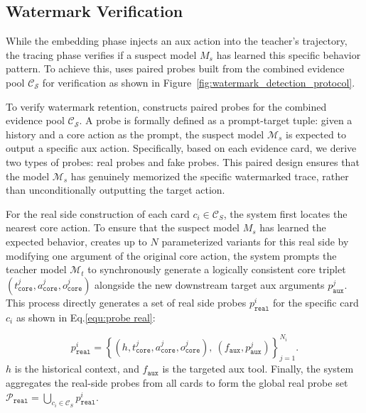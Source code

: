 \subsection{Watermark Verification}

\label{Detection}
While the embedding phase injects an aux action into the teacher's trajectory, the tracing phase verifies if a suspect model $M_s$ has learned this specific behavior pattern. To achieve this, \name{} uses paired probes built from the combined evidence pool $\mathcal{C}_{\mathcal{S}}$ for verification as shown in Figure~\ref{fig:watermark_detection_protocol}.



 To verify watermark retention, \name{} constructs paired probes for the combined evidence pool $\mathcal{C}_{\mathcal{S}}$. A probe is formally defined as a prompt-target tuple: given a history and a core action as the prompt, the suspect model $\mathcal{M}_s$ is expected to output a specific aux action. Specifically, based on each evidence card, we derive two types of probes: real probes and  fake probes. This paired design ensures that the model $\mathcal{M}_s$ has genuinely memorized the specific watermarked trace, rather than unconditionally outputting the target action.

For the real side construction of each card $c_i \in \mathcal{C}_S$, the system first locates the nearest core action. To ensure that the suspect model $M_s$ has learned the expected behavior, \name{} creates up to $N$ parameterized variants for this real side by modifying one argument of the original core action, the system prompts the teacher model $\mathcal{M}_t$ to synchronously generate a logically consistent core triplet $(t_{\mathtt{core}}^j, a_{\mathtt{core}}^j, o_{\mathtt{core}}^j)$ alongside the new downstream target aux arguments $p_{\mathtt{aux}}^j$. This process directly generates a set of real side probes $p_{\mathtt{real}}^i$ for the specific card $c_i$ as shown in Eq.\ref{equ:probe real}:
    
\begin{equation}
    \label{equ:probe real}
p_{\mathtt{real}}^i = \left\{ (h, t_{\mathtt{core}}^j, a_{\mathtt{core}}^j, o_{\mathtt{core}}^j),\ (f_{\mathtt{aux}}, p_{\mathtt{aux}}^j)  \right\}_{j=1}^{N_i}.
\end{equation}
$h$ is the historical context, and $f_{\mathtt{aux}}$ is the targeted aux tool. Finally, the system aggregates the real-side probes from all cards to form the global real probe set $\mathcal{P}_{\mathtt{real}} = \bigcup_{c_i \in \mathcal{C}_S} p_{\mathtt{real}}^i$.


